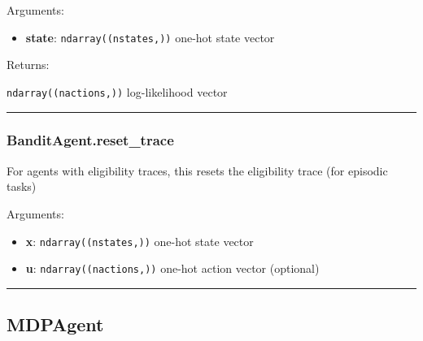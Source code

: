 Arguments:

\begin{itemize}
\tightlist
\item
  \textbf{state}: \texttt{ndarray((nstates,))} one-hot state vector
\end{itemize}

Returns:

\texttt{ndarray((nactions,))} log-likelihood vector

\begin{center}\rule{0.5\linewidth}{\linethickness}\end{center}

\subsubsection{BanditAgent.reset\_trace}\label{banditagent.reset_trace}

\begin{Shaded}
\begin{Highlighting}[]
\OperatorTok{=}\NormalTok{)}
\end{Highlighting}
\end{Shaded}

For agents with eligibility traces, this resets the eligibility trace
(for episodic tasks)

Arguments:

\begin{itemize}
\tightlist
\item
  \textbf{x}: \texttt{ndarray((nstates,))} one-hot state vector
\item
  \textbf{u}: \texttt{ndarray((nactions,))} one-hot action vector
  (optional)
\end{itemize}

\begin{center}\rule{0.5\linewidth}{\linethickness}\end{center}

\subsection{MDPAgent}\label{mdpagent}

\begin{Shaded}
\begin{Highlighting}[]
\end{Highlighting}
\end{Shaded}

